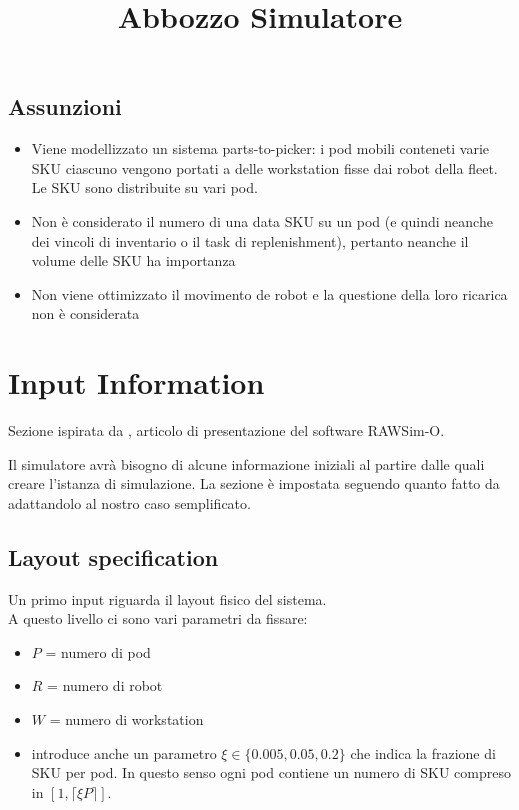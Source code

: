 \documentclass{article}
\title{Abbozzo Simulatore}
\begin{document}
\maketitle	

\subsection{Assunzioni}
\begin{itemize}
    \item Viene modellizzato un sistema parts-to-picker: i pod mobili conteneti varie SKU ciascuno vengono portati a delle workstation fisse dai robot della fleet. Le SKU sono distribuite su vari pod.
    \item Non è considerato il numero di una data SKU su un pod (e quindi neanche dei vincoli di inventario o il task di replenishment), pertanto neanche il volume delle SKU ha importanza
    \item Non viene ottimizzato il movimento de robot e la questione della loro ricarica non è considerata

\end{itemize}


\section{Input Information}
Sezione ispirata da \cite{Merschformann2017RAWSimOAS}, articolo di presentazione del software RAWSim-O.

Il simulatore avrà bisogno di alcune informazione iniziali al partire dalle quali creare l'istanza di simulazione. La sezione è impostata seguendo quanto fatto da \cite{Merschformann2017RAWSimOAS} adattandolo al nostro caso semplificato.

\subsection{Layout specification}
Un primo input riguarda il layout fisico del sistema. \\
A questo livello ci sono vari parametri da fissare:
\begin{itemize}
    \item $P$ = numero di pod
    \item $R$ = numero di robot
    \item $W$ = numero di workstation
    \item \cite{BOYSEN2017550} introduce anche un parametro $\xi \in \{0.005, 0.05, 0.2\}$ che indica la frazione di SKU per pod. In questo senso ogni pod contiene un numero di SKU compreso in  $[1, \lceil \xi P \rceil ]$.
\end{itemize}
\end{document}
